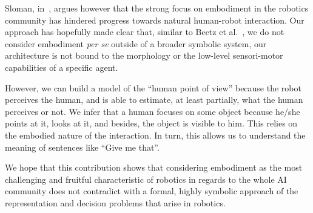 Sloman, in~\cite{Sloman2009}, argues however that the strong focus on
embodiment in the robotics community has hindered progress towards natural
human-robot interaction. Our approach has hopefully made clear that, similar to
Beetz et al.~\cite{Beetz2010}, we do not consider embodiment \emph{per se} outside of
a broader symbolic system, \ie our architecture is not bound to the morphology or
the low-level sensori-motor capabilities of a specific agent. 

However, we can build a model of the ``human point of view'' because the robot
perceives the human, and is able to estimate, at least partially, what the
human perceives or not. We infer that a human focuses on some object because
he/she points at it, looks at it, and besides, the object is visible to him.
This relies on the embodied nature of the interaction. In turn, this allows us
to understand the meaning of sentences like ``Give me that''.

We hope that this contribution shows that considering embodiment as the most
challenging and fruitful characteristic of robotics in regards to the whole AI
community does not contradict with a formal, highly symbolic approach of the
representation and decision problems that arise in robotics. 

